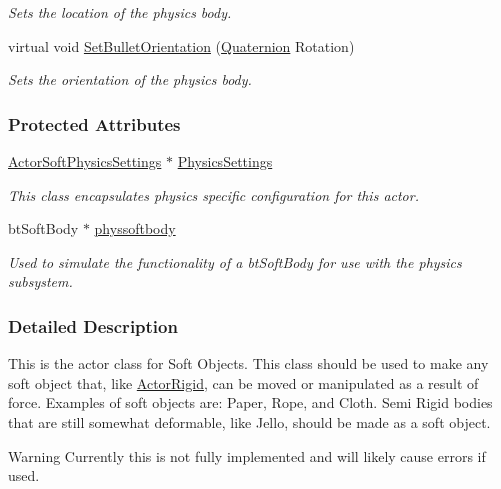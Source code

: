 \begin{DoxyCompactItemize}
\begin{DoxyCompactList}\small\item\em Sets the location of the physics body. \item\end{DoxyCompactList}\item 
virtual void \hyperlink{classphys_1_1ActorSoft_a4a1119b6e42ff11784673657e7d62c1f}{SetBulletOrientation} (\hyperlink{classphys_1_1Quaternion}{Quaternion} Rotation)
\begin{DoxyCompactList}\small\item\em Sets the orientation of the physics body. \item\end{DoxyCompactList}\end{DoxyCompactItemize}
\subsubsection*{Protected Attributes}
\begin{DoxyCompactItemize}
\item 
\hypertarget{classphys_1_1ActorSoft_a66c879cdae4ca6a90cb696083513c115}{
\hyperlink{classphys_1_1ActorSoftPhysicsSettings}{ActorSoftPhysicsSettings} $\ast$ \hyperlink{classphys_1_1ActorSoft_a66c879cdae4ca6a90cb696083513c115}{PhysicsSettings}}
\label{classphys_1_1ActorSoft_a66c879cdae4ca6a90cb696083513c115}

\begin{DoxyCompactList}\small\item\em This class encapsulates physics specific configuration for this actor. \item\end{DoxyCompactList}\item 
\hypertarget{classphys_1_1ActorSoft_ab3b2c8e1f94dff3e3244a5024595afef}{
btSoftBody $\ast$ \hyperlink{classphys_1_1ActorSoft_ab3b2c8e1f94dff3e3244a5024595afef}{physsoftbody}}
\label{classphys_1_1ActorSoft_ab3b2c8e1f94dff3e3244a5024595afef}

\begin{DoxyCompactList}\small\item\em Used to simulate the functionality of a btSoftBody for use with the physics subsystem. \item\end{DoxyCompactList}\end{DoxyCompactItemize}


\subsubsection{Detailed Description}
This is the actor class for Soft Objects. This class should be used to make any soft object that, like \hyperlink{classphys_1_1ActorRigid}{ActorRigid}, can be moved or manipulated as a result of force. Examples of soft objects are: Paper, Rope, and Cloth. Semi Rigid bodies that are still somewhat deformable, like Jello, should be made as a soft object. \begin{DoxyWarning}{Warning}
Currently this is not fully implemented and will likely cause errors if used. 
\end{DoxyWarning}


